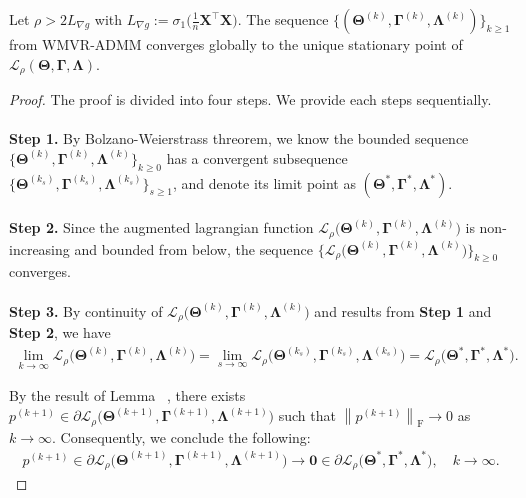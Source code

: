 \documentclass[alpha-refs]{wiley-article}
\begin{document}
\newpage
\begin{theorem} \label{convergence}
    Let $\rho>2L_{\nabla g}$ with $L_{\nabla g}:=\sigma_{1}\big( \frac{1}{n}\boldsymbol{X}^{\top}\boldsymbol{X}\big)$.
    The sequence $\{(\boldsymbol{\Theta}^{(k)},\boldsymbol{\Gamma}^{(k)},\boldsymbol{\Lambda}^{(k)})\}_{k \geq 1}$ from WMVR-ADMM
    converges globally to the unique stationary point of $\mathcal{L}_{\rho}(\boldsymbol{\Theta},\boldsymbol{\Gamma},\boldsymbol{\Lambda})$.
\end{theorem}
\begin{proof}
The proof is divided into four steps. We provide each steps sequentially.\\ \\
{\textbf{Step 1.}}
By Bolzano-Weierstrass threorem, we know the bounded sequence $\{\boldsymbol{\Theta}^{(k)},\boldsymbol{\Gamma}^{(k)},\boldsymbol{\Lambda}^{(k)}\}_{k \geq 0}$ has a convergent subsequence
$\{\boldsymbol{\Theta}^{(k_{s})},\boldsymbol{\Gamma}^{(k_{s})},\boldsymbol{\Lambda}^{(k_{s})}\}_{s \geq 1}$, and denote its limit point as $(\boldsymbol{\Theta}^{*},\boldsymbol{\Gamma}^{*},\boldsymbol{\Lambda}^{*})$. 
\\ \\
{\textbf{Step 2.}}
Since the augmented lagrangian function $\mathcal{L}_{\rho} \big( \boldsymbol{\Theta}^{(k)},\boldsymbol{\Gamma}^{(k)},\boldsymbol{\Lambda}^{(k)} \big)$ is non-increasing and bounded from below,
the sequence $\{\mathcal{L}_{\rho} \big( \boldsymbol{\Theta}^{(k)},\boldsymbol{\Gamma}^{(k)},\boldsymbol{\Lambda}^{(k)} \big)\}_{k \geq 0}$ converges.
\\ \\
{\textbf{Step 3.}}
By continuity of $\mathcal{L}_{\rho} \big( \boldsymbol{\Theta}^{(k)},\boldsymbol{\Gamma}^{(k)},\boldsymbol{\Lambda}^{(k)} \big)$ and results from \textbf{Step 1} and \textbf{Step 2}, we have
\begin{align*}
    \lim_{k\rightarrow{\infty}} \mathcal{L}_{\rho} \big( \boldsymbol{\Theta}^{(k)},\boldsymbol{\Gamma}^{(k)},\boldsymbol{\Lambda}^{(k)} \big)
    = \lim_{s\rightarrow{\infty}} \mathcal{L}_{\rho} \big( \boldsymbol{\Theta}^{(k_{s})},\boldsymbol{\Gamma}^{(k_{s})},\boldsymbol{\Lambda}^{(k_{s})} \big)
    = \mathcal{L}_{\rho} \big( \boldsymbol{\Theta}^{*},\boldsymbol{\Gamma}^{*},\boldsymbol{\Lambda}^{*} \big).
\end{align*}

By the result of Lemma ~, there exists $p^{(k+1)}\in\partial \mathcal{L}_{\rho} \big( \boldsymbol{\Theta}^{(k+1)},\boldsymbol{\Gamma}^{(k+1)},\boldsymbol{\Lambda}^{(k+1)} \big)$ such that $\left\|p^{(k+1)}\right\|_{\text{F}}\rightarrow{0}$ as $k\rightarrow{\infty}$.
Consequently, we conclude the following:
\begin{align*}
    p^{(k+1)}\in\partial \mathcal{L}_{\rho} \big( \boldsymbol{\Theta}^{(k+1)},\boldsymbol{\Gamma}^{(k+1)},\boldsymbol{\Lambda}^{(k+1)} \big) \rightarrow{ \boldsymbol{0}\in\partial \mathcal{L}_{\rho} \big( \boldsymbol{\Theta}^{*},\boldsymbol{\Gamma}^{*},\boldsymbol{\Lambda}^{*} \big)}, \quad
    k\rightarrow{\infty}.
\end{align*}


\end{proof}
\end{document}
